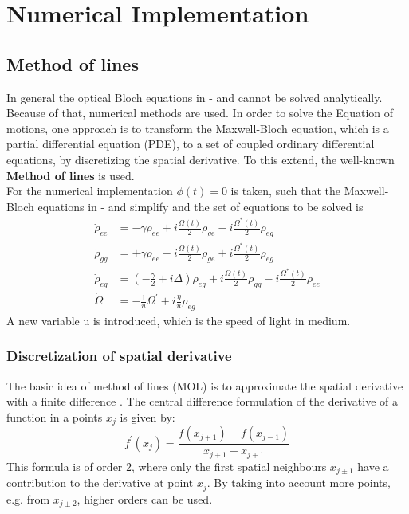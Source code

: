 \chapter{Numerical Implementation}

\section{Method of lines}
In general the optical Bloch equations in - and  cannot be solved analytically. Because of that, numerical methods are used. In order to solve the Equation of motions, one approach is to transform the Maxwell-Bloch equation, which is a partial differential equation (PDE), to a set of coupled ordinary differential equations, by discretizing the spatial derivative. To this extend, the well-known \textbf{Method of lines} \cite{Hamdi:2007} is used. \\

For the numerical implementation $\phi(t) = 0$ is taken, such that the Maxwell-Bloch equations in - and  simplify and the set of equations to be solved is
\begin{subequations}
\begin{align}
    \dot{\rho}_{ee} &= -\gamma \rho_{ee} + i \frac{\Omega(t)}{2} \rho_{ge} - i \frac{\Omega^*(t)}{2} \rho_{eg} \label{rhoee_act} \\
    \dot{\rho}_{gg} &= +\gamma \rho_{ee} - i \frac{\Omega(t)}{2} \rho_{ge} + i \frac{\Omega^*(t)}{2} \rho_{eg}\label{rhogg_act} \\
    \dot{\rho}_{eg} &= \left( -\frac{\gamma}{2} + i\Delta \right) \rho_{eg} + i\frac{\Omega(t)}{2} \rho_{gg} - i\frac{\Omega^*(t)}{2} \rho_{ee} \label{rhoeg_act} \\
    \dot{\Omega} &= -\frac{1}{u} \Omega^{\prime} + i\frac{\eta}{u} \rho_{eg}\label{omega_act}
\end{align}
\end{subequations}
A new variable u is introduced, which is the speed of light in medium. 

\subsection{Discretization of spatial derivative}
The basic idea of method of lines (MOL) is to approximate the spatial derivative with a finite difference \cite{Hamdi:2007}. The central difference formulation of the derivative of a function in a points $x_j$ is given by:
\begin{equation}
    f^{\prime}(x_j) = \frac{f(x_{j+1}) - f(x_{j-1})}{x_{j+1} - x_{j+1}} \label{finite_second}
\end{equation}
This formula is of order 2, where only the first spatial neighbours $x_{j \pm 1}$ have a contribution to the derivative at point $x_j$. By taking into account more points, e.g. from $x_{j \pm 2}$, higher orders can be used. 


